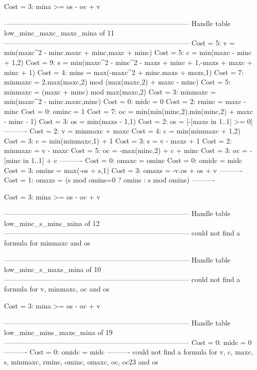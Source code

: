 Cost =  3:  mina >= os - oc + v

--------------------------------------------------------------------------------
Handle table low_minc_maxc_maxs_mina of 11
--------------------------------------------------------------------------------
Cost =  5:  v       = min(maxc^2 - minc.maxc + minc,maxc + minc)
Cost =  5:  c       = min(maxc - minc + 1,2)
Cost =  9:  s       = min(maxc^2 - minc^2 - maxs + minc + 1,-maxs + maxc + minc + 1)
Cost =  4:  mins    = max(-maxc^2 + minc.maxs + maxs,1)
Cost =  7:  minmaxc = 2.max(maxc,2) mod (max(maxc,2) + maxc - minc)
Cost =  5:  minmaxc = (maxc + minc) mod max(maxc,2)
Cost =  3:  minmaxc = min(maxc^2 - minc.maxc,minc)
Cost =  0:  midc    = 0
Cost =  2:  rminc   = maxc - minc
Cost =  0:  ominc   = 1
Cost =  7:  oc      = min(min(minc,2),min(minc,2) + maxc - minc - 1)
Cost =  3:  os      = min(maxs - 1,1)
Cost =  2:  os      = [-[maxs in 1..1] >= 0]
----------
Cost =  2:  v       = minmaxc + maxc
Cost =  4:  c       = min(minmaxc + 1,2)
Cost =  3:  c       = min(minmaxc,1) + 1
Cost =  3:  s       = v - maxs + 1
Cost =  2:  minmaxc = v - maxc
Cost =  5:  oc      = -max(minc,2) + c + minc
Cost =  3:  oc      = -[minc in 1..1] + c
----------
Cost =  0:  omaxc   = ominc
Cost =  0:  omidc   = midc
Cost =  3:  omins   = max(-os + s,1)
Cost =  3:  omaxs   = -v.os + os + v
----------
Cost =  1:  omaxs   = (s mod omins=0 ? omins : s mod omins)
----------

Cost =  3:  mina >= os - oc + v

--------------------------------------------------------------------------------
Handle table low_minc_s_mins_mina of 12
--------------------------------------------------------------------------------
could not find a formula for minmaxc and os


--------------------------------------------------------------------------------
Handle table low_minc_s_maxs_mina of 10
--------------------------------------------------------------------------------
could not find a formula for v, minmaxc, oc and os

Cost =  3:  mina >= os - oc + v

--------------------------------------------------------------------------------
Handle table low_minc_mins_maxs_mina of 19
--------------------------------------------------------------------------------
Cost =  0:  midc    = 0
----------
Cost =  0:  omidc   = midc
----------
could not find a formula for v, c, maxc, s, minmaxc, rminc, ominc, omaxc, oc, oc23 and os


